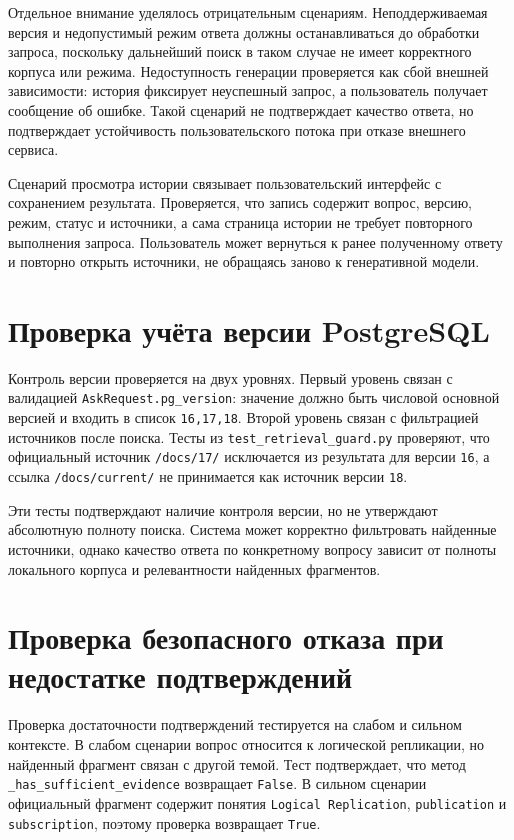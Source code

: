 Отдельное внимание уделялось отрицательным сценариям. Неподдерживаемая версия и недопустимый режим ответа должны останавливаться до обработки запроса, поскольку дальнейший поиск в таком случае не имеет корректного корпуса или режима. Недоступность генерации проверяется как сбой внешней зависимости: история фиксирует неуспешный запрос, а пользователь получает сообщение об ошибке. Такой сценарий не подтверждает качество ответа, но подтверждает устойчивость пользовательского потока при отказе внешнего сервиса.

Сценарий просмотра истории связывает пользовательский интерфейс с сохранением результата. Проверяется, что запись содержит вопрос, версию, режим, статус и источники, а сама страница истории не требует повторного выполнения запроса. Пользователь может вернуться к ранее полученному ответу и повторно открыть источники, не обращаясь заново к генеративной модели.

\section{Проверка учёта версии PostgreSQL}

Контроль версии проверяется на двух уровнях. Первый уровень связан с валидацией \texttt{AskRequest.pg\_version}: значение должно быть числовой основной версией и входить в список \texttt{16,17,18}. Второй уровень связан с фильтрацией источников после поиска. Тесты из \texttt{test\_retrieval\_guard.py} проверяют, что официальный источник \texttt{/docs/17/} исключается из результата для версии \texttt{16}, а ссылка \texttt{/docs/current/} не принимается как источник версии \texttt{18}.

Эти тесты подтверждают наличие контроля версии, но не утверждают абсолютную полноту поиска. Система может корректно фильтровать найденные источники, однако качество ответа по конкретному вопросу зависит от полноты локального корпуса и релевантности найденных фрагментов.

\section{Проверка безопасного отказа при недостатке подтверждений}

Проверка достаточности подтверждений тестируется на слабом и сильном контексте. В слабом сценарии вопрос относится к логической репликации, но найденный фрагмент связан с другой темой. Тест подтверждает, что метод \texttt{\_has\_sufficient\_evidence} возвращает \texttt{False}. В сильном сценарии официальный фрагмент содержит понятия \texttt{Logical Replication}, \texttt{publication} и \texttt{subscription}, поэтому проверка возвращает \texttt{True}.

